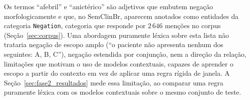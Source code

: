 Os termos ``afebril'' e ``anictérico'' são adjetivos que embutem negação
morfologicamente e que, no SemClinBr, aparecem anotados como entidades da categoria
\texttt{Negation}, categoria que responde por $2\,646$ menções no corpus
(Seção~\ref{sec:corpus}). Uma abordagem puramente léxica sobre esta lista não
trataria negação de escopo amplo (``o paciente não apresenta nenhum dos seguintes:
A, B, C''), negação estendida por conjunção, nem a direção da relação, limitações
que motivam o uso de modelos contextuais, capazes de aprender o escopo a partir do
contexto em vez de aplicar uma regra rígida de janela. A Seção~\ref{sec:fase2_resultados}
mede essa limitação, ao comparar uma regra puramente léxica com os modelos
contextuais sobre o mesmo conjunto de teste.
